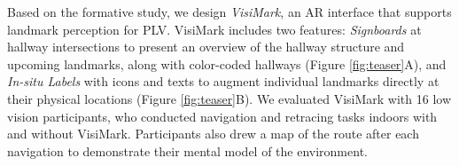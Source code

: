Based on the formative study, we design \textit{VisiMark}, an AR interface that supports landmark perception for PLV. VisiMark includes two features: \textit{Signboards} at hallway intersections to present an overview of the hallway structure and upcoming landmarks, along with color-coded hallways (Figure \ref{fig:teaser}A), and \textit{In-situ Labels} with icons and texts to augment individual landmarks directly at their physical locations (Figure \ref{fig:teaser}B). We evaluated VisiMark with 16 low vision participants, who conducted navigation and retracing tasks indoors with and without VisiMark. %
Participants also drew a map of the route after each navigation to demonstrate their mental model of the environment.


